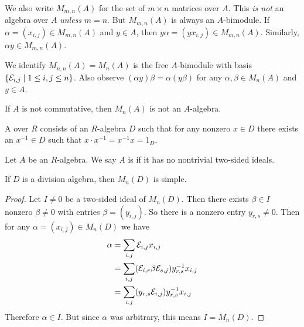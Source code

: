 \begin{notation}
We also write $M_{m,n}(A)$ for the set of $m\times n$ matrices over $A$.
This \emph{is not} an algebra over $A$ \emph{unless} $m=n$. But
$M_{m,n}(A)$ is always an $A$-bimodule. If $\alpha=(x_{i,j})\in M_{m,n}(A)$
and $y\in A$, then $y\alpha=(yx_{i,j})\in M_{m,n}(A)$. Similarly,
$\alpha y\in M_{m,n}(A)$.

We identify $M_{n,n}(A)=M_{n}(A)$ is the free $A$-bimodule with basis
$\{\mathcal{E}_{i,j}\mid 1\leq i,j\leq n\}$. Also observe $(\alpha y)\beta=\alpha(y\beta)$
for any $\alpha,\beta\in M_{n}(A)$ and $y\in A$.
\end{notation}

\begin{caution}
If $A$ is not commutative, then $M_{n}(A)$ is not an $A$-algebra.
\end{caution}

\begin{definition}
A  over $R$ consists of an $R$-algebra $D$
such that for any nonzero $x\in D$ there exists an $x^{-1}\in D$ such
that $x\cdot x^{-1}=x^{-1}x=1_{D}$. 
\end{definition}

\begin{definition}
Let $A$ be an $R$-algebra. We say $A$ is  if it has no
nontrivial two-sided ideals.
\end{definition}

\begin{lemma}
If $D$ is a division algebra, then $M_{n}(D)$ is simple.
\end{lemma}

\begin{proof}
Let $I\neq0$ be a two-sided ideal of $M_{n}(D)$. Then there exists
$\beta\in I$ nonzero $\beta\neq0$ with entries $\beta=(y_{i,j})$. So
there is a nonzero entry $y_{r,s}\neq0$. Then for any
$\alpha=(x_{i,j})\in M_{n}(D)$ we have
\begin{subequations}
  \begin{align}
\alpha&=\sum_{i,j}\mathcal{E}_{i,j}x_{i,j}\\
&=\sum_{i,j}(\mathcal{E}_{i,r}\beta\mathcal{E}_{s,j})y_{r,s}^{-1}x_{i,j}\\
&=\sum_{i,j}(y_{r,s}\mathcal{E}_{i,j})y_{r,s}^{-1}x_{i,j}
  \end{align}
\end{subequations}
Therefore $\alpha\in I$. But since $\alpha$ was arbitrary, this means
$I=M_{n}(D)$. 
\end{proof}

